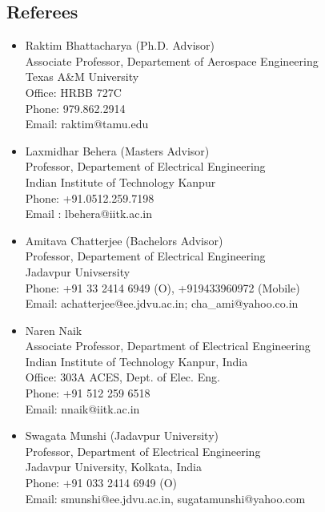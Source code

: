 \documentclass[margin,line]{resume}
\begin{document}
\begin{resume}
    \section{\mysidestyle Referees}
    \begin{itemize}
        \item Raktim Bhattacharya (Ph.D. Advisor)\\
        Associate  Professor, Departement of Aerospace Engineering\\
        Texas A\&M University \\
        Office: HRBB 727C\\
        Phone: 979.862.2914\\
        Email: raktim@tamu.edu
        \item Laxmidhar Behera (Masters Advisor)\\
        Professor, Departement of Electrical Engineering\\
        Indian Institute of Technology Kanpur\\
        Phone: +91.0512.259.7198\\
        Email : lbehera@iitk.ac.in
        \item Amitava Chatterjee (Bachelors Advisor)\\
        Professor, Departement of Electrical Engineering\\
        Jadavpur Univsersity\\
        Phone:   +91 33 2414 6949 (O), +919433960972 (Mobile)\\
        Email: achatterjee@ee.jdvu.ac.in; cha\_ami@yahoo.co.in
        \item Naren Naik \\
        Associate Professor, Department of Electrical Engineering\\
        Indian Institute of Technology Kanpur, India\\
        Office: 303A ACES, Dept. of Elec. Eng.\\
        Phone: +91 512 259 6518 \\
        Email: nnaik@iitk.ac.in
        \item Swagata Munshi (Jadavpur University)\\
        Professor, Department of Electrical Engineering\\
        Jadavpur University, Kolkata, India\\
        Phone: +91 033 2414 6949 (O)\\
        Email: smunshi@ee.jdvu.ac.in, sugatamunshi@yahoo.com
    \end{itemize}

\end{resume}
\end{document}
